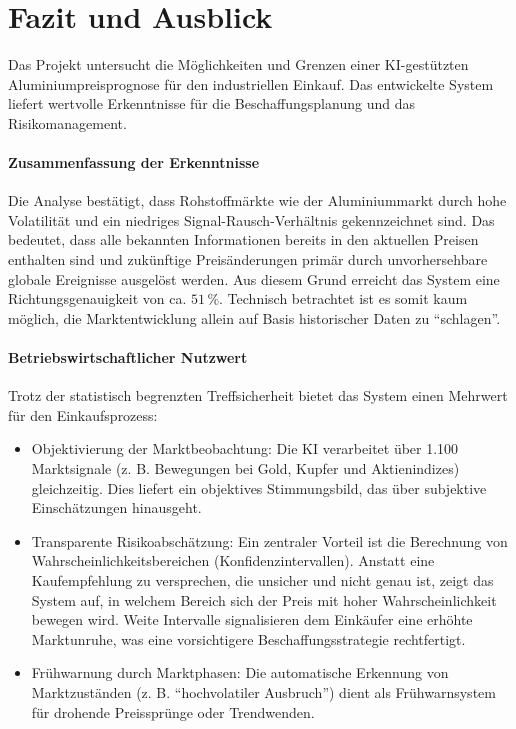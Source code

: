 \section{Fazit und Ausblick}
\label{sec:fazit}

Das Projekt untersucht die Möglichkeiten und Grenzen einer KI-gestützten Aluminiumpreisprognose für den industriellen Einkauf. Das entwickelte System liefert wertvolle Erkenntnisse für die Beschaffungsplanung und das Risikomanagement.

\paragraph{Zusammenfassung der Erkenntnisse}
Die Analyse bestätigt, dass Rohstoffmärkte wie der Aluminiummarkt durch hohe Volatilität und ein niedriges Signal-Rausch-Verhältnis gekennzeichnet sind. Das bedeutet, dass alle bekannten Informationen bereits in den aktuellen Preisen enthalten sind und zukünftige Preisänderungen primär durch unvorhersehbare globale Ereignisse ausgelöst werden. Aus diesem Grund erreicht das System eine Richtungsgenauigkeit von ca. $51\,\%$. Technisch betrachtet ist es somit kaum möglich, die Marktentwicklung allein auf Basis historischer Daten zu "`schlagen"'.

\paragraph{Betriebswirtschaftlicher Nutzwert}
Trotz der statistisch begrenzten Treffsicherheit bietet das System einen Mehrwert für den Einkaufsprozess:
\begin{itemize}
    \item Objektivierung der Marktbeobachtung: Die KI verarbeitet über 1.100 Marktsignale (z. B. Bewegungen bei Gold, Kupfer und Aktienindizes) gleichzeitig. Dies liefert ein objektives Stimmungsbild, das über subjektive Einschätzungen hinausgeht.
    \item Transparente Risikoabschätzung: Ein zentraler Vorteil ist die Berechnung von Wahrscheinlichkeitsbereichen (Konfidenzintervallen). Anstatt eine Kaufempfehlung zu versprechen, die unsicher und nicht genau ist, zeigt das System auf, in welchem Bereich sich der Preis mit hoher Wahrscheinlichkeit bewegen wird. Weite Intervalle signalisieren dem Einkäufer eine erhöhte Marktunruhe, was eine vorsichtigere Beschaffungsstrategie rechtfertigt.
    \item Frühwarnung durch Marktphasen: Die automatische Erkennung von Marktzuständen (z. B. "`hochvolatiler Ausbruch"') dient als Frühwarnsystem für drohende Preissprünge oder Trendwenden.
\end{itemize}

